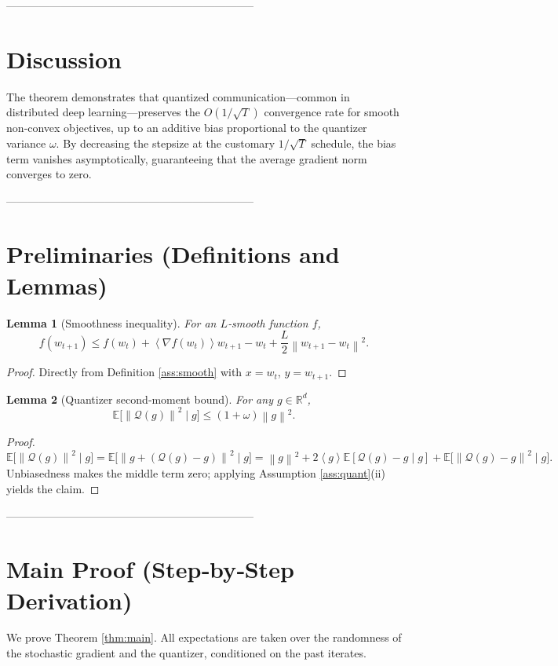\documentclass{article}
\newtheorem{lemma}{Lemma}
\newcommand{\E}{\mathbb{E}}
\newcommand{\norm}[1]{\left\|#1\right\|}
\newcommand{\inner}[1]{\left\langle #1\right\rangle}
\newcommand{\Q}{\mathcal{Q}}
\begin{document}
--------------------------------------------------------------------

\section*{Discussion}
The theorem demonstrates that quantized communication—common in distributed deep learning—preserves the $O(1/\sqrt{T})$ convergence rate for smooth non‑convex objectives, up to an additive bias proportional to the quantizer variance $\omega$. By decreasing the stepsize at the customary $1/\sqrt{T}$ schedule, the bias term vanishes asymptotically, guaranteeing that the average gradient norm converges to zero.

--------------------------------------------------------------------

\section*{Preliminaries (Definitions and Lemmas)}
\begin{lemma}[Smoothness inequality]\label{lem:smooth}
For an $L$‑smooth function $f$,
\[
f(w_{t+1})\le f(w_t)+\inner{\nabla f(w_t)}{w_{t+1}-w_t}
+\frac{L}{2}\norm{w_{t+1}-w_t}^2 .
\]
\end{lemma}
\begin{proof}
Directly from Definition \ref{ass:smooth} with $x=w_t$, $y=w_{t+1}$. \qedhere
\end{proof}

\begin{lemma}[Quantizer second‑moment bound]\label{lem:quant}
For any $g\in\mathbb{R}^d$,
\[
\E\big[\norm{\Q(g)}^2\mid g\big]\le (1+\omega)\norm{g}^2 .
\]
\end{lemma}
\begin{proof}
\[
\E\!\big[\norm{\Q(g)}^2\mid g\big]
=\E\!\big[\norm{g+(\Q(g)-g)}^2\mid g\big]
=\norm{g}^2+2\inner{g}{\E[\Q(g)-g\mid g]}+\E\!\big[\norm{\Q(g)-g}^2\mid g\big].
\]
Unbiasedness makes the middle term zero; applying Assumption \ref{ass:quant}(ii) yields the claim. \qedhere
\end{proof}

--------------------------------------------------------------------

\section*{Main Proof (Step‑by‑Step Derivation)}
We prove Theorem \ref{thm:main}. All expectations are taken over the randomness of the stochastic gradient and the quantizer, conditioned on the past iterates.
\end{document}
